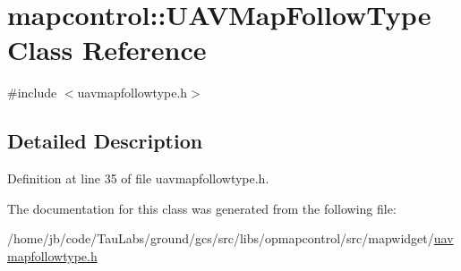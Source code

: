 \hypertarget{classmapcontrol_1_1_u_a_v_map_follow_type}{\section{mapcontrol\-:\-:\-U\-A\-V\-Map\-Follow\-Type \-Class \-Reference}
\label{classmapcontrol_1_1_u_a_v_map_follow_type}
}


{\ttfamily \#include $<$uavmapfollowtype.\-h$>$}



\subsection{\-Detailed \-Description}


\-Definition at line 35 of file uavmapfollowtype.\-h.



\-The documentation for this class was generated from the following file\-:\begin{DoxyCompactItemize}
\item 
/home/jb/code/\-Tau\-Labs/ground/gcs/src/libs/opmapcontrol/src/mapwidget/\hyperlink{uavmapfollowtype_8h}{uavmapfollowtype.\-h}\end{DoxyCompactItemize}
